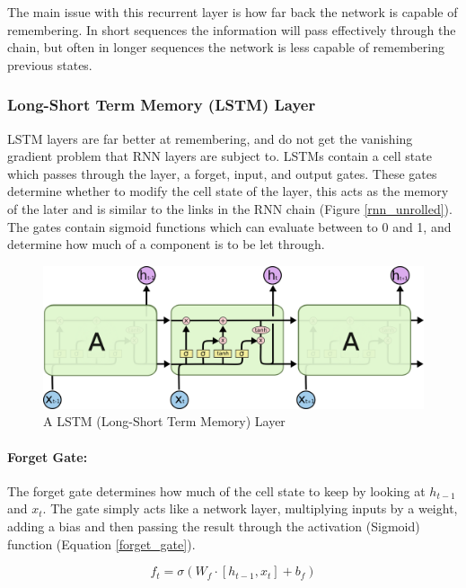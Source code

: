 \documentclass[11pt,twoside]{report}
\begin{document}
The main issue with this recurrent layer is how far back the network is capable of remembering. In short sequences the information will pass effectively through the chain, but often in longer sequences the network is less capable of remembering previous states. 

\subsubsection{Long-Short Term Memory (LSTM) Layer} 
LSTM layers are far better at remembering, and do not get the vanishing gradient problem that RNN layers are subject to. LSTMs contain a cell state which passes through the layer, a forget, input, and output gates. These gates determine whether to modify the cell state of the layer, this acts as the memory of the later and is similar to the links in the RNN chain (Figure \ref{rnn_unrolled}). The gates contain sigmoid functions which can evaluate between to 0 and 1, and determine how much of a component is to be let through.

\noindent \begin{figure}[h!]
	\includegraphics[width = 1.0\hsize]{./figures/LSTM3-chain.png}
	\caption{A LSTM (Long-Short Term Memory) Layer \cite{Christopher_Olah_Blog}}
	\label{lstm_fig}
\end{figure}


\paragraph{Forget Gate:}
The forget gate determines how much of the cell state to keep by looking at $h_{t-1}$ and $x_{t}$. The gate simply acts like a network layer, multiplying inputs by a weight, adding a bias and then passing the result through the activation (Sigmoid) function (Equation \ref{forget_gate}). 

\begin{equation}
\label{forget_gate}
f_{t} = \sigma (W_{f} \cdot [h_{t-1},x_{t}] + b_{f})
\end{equation}
\end{document}
